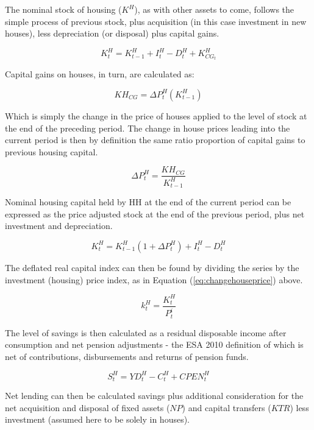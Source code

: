 \documentclass[
]{book}
\begin{document}
The nominal stock of housing (\(K^H\)), as with other assets to come, follows the simple
process of previous stock, plus acquisition (in this case investment in new houses),
less depreciation (or disposal) plus capital gains.

\begin{equation}
K^H_t = K^H_{t-1} + I^H_t - D^H_t + K^H_{CG_t}
\end{equation}

Capital gains on houses, in turn, are calculated as:

\begin{equation}
KH_{CG} = \Delta P^H_t (K^H_{t-1})
\end{equation}

Which is simply the change in the price of houses applied to the level of stock at
the end of the preceding period.
The change in house prices leading into the current period is then by definition the same
ratio proportion of capital gains to previous housing capital.

\begin{equation}
\Delta P^H_t = \frac{KH_{CG}}{K^H_{t-1}}
\label{eq:changehouseprice}
\end{equation}

Nominal housing capital held by HH at the end of the current period
can be expressed as the price adjusted stock at the end of the previous
period, plus net investment and depreciation.

\begin{equation}
K^H_t = K^H_{t-1}(1 + \Delta P^H_t) + I^H_t- D^H_t
\end{equation}

The deflated real capital index can then be found by dividing the series by the
investment (housing) price index, as in Equation (\ref{eq:changehouseprice}) above.

\begin{equation}
k^H_t = \frac{K^H_t}{P^i_t}
\end{equation}

The level of savings is then calculated as a residual disposable income after
consumption and net pension adjustments - the ESA 2010 \citep{ESA2010} definition
of which is net of contributions, disbursements and returns of pension funds.

\begin{equation}
S^H_t = YD^H_t - C^H_t + CPEN^H_t
\end{equation}

Net lending can then be calculated savings plus additional consideration for the
net acquisition and disposal of fixed assets (\(NP\)) and capital transfers (\(KTR\))
less investment (assumed here to be solely in houses).
\end{document}
